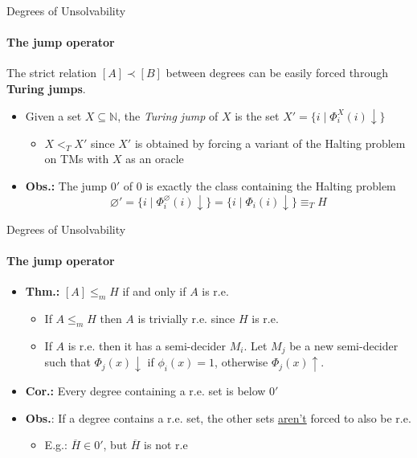 \documentclass{beamer}
\newcommand{\N}{\mathbb{N}}                     %
\begin{document}
\begin{frame}{Degrees of Unsolvability}
\framesubtitle{The jump operator}
    The strict relation $[A] \prec [B]$ between degrees can be easily forced through \textbf{Turing jumps}.
    \begin{itemize}[<+->]
        \item Given a set $X \subseteq \N$, the \textit{Turing jump} of $X$ is the set $X' = \{i \mid \Phi_i^X(i) \downarrow\}$
        \begin{itemize}
            \item $X <_T X'$ since $X'$ is obtained by forcing a variant of the Halting problem on TMs with $X$ as an oracle
        \end{itemize}
        \item \textbf{Obs.:} The jump $0'$ of $0$ is exactly the class containing the Halting problem
        \[\varnothing' = \{i \mid \Phi_i^\varnothing(i) \downarrow\} = \{i \mid \Phi_i(i) \downarrow\} \equiv_T H\]
    \end{itemize}
\end{frame}

\begin{frame}{Degrees of Unsolvability}
\framesubtitle{The jump operator}
    \begin{itemize}[<+->]
        \item \textbf{Thm.:} $[A] \leq_m H$ if and only if $A$ is r.e.
        
        \begin{itemize}
            \item If $A \leq_m H$ then $A$ is trivially r.e. since $H$ is r.e.
            \item If $A$ is r.e. then it has a semi-decider $M_i$. Let $M_j$ be a new semi-decider such that $\Phi_j(x) \downarrow$ if $\phi_i(x) = 1$, otherwise $\Phi_j(x) \uparrow$.
        \end{itemize}

        \item \textbf{Cor.:} Every degree containing a r.e. set is below $0'$
        \item \textbf{Obs.}: If a degree contains a r.e. set, the other sets \underline{aren't} forced to also be r.e.
            \begin{itemize}
                \item E.g.: $\overline{H} \in 0'$, but  $\overline{H}$ is not r.e 
            \end{itemize}
    \end{itemize}
\end{frame}
\end{document}
